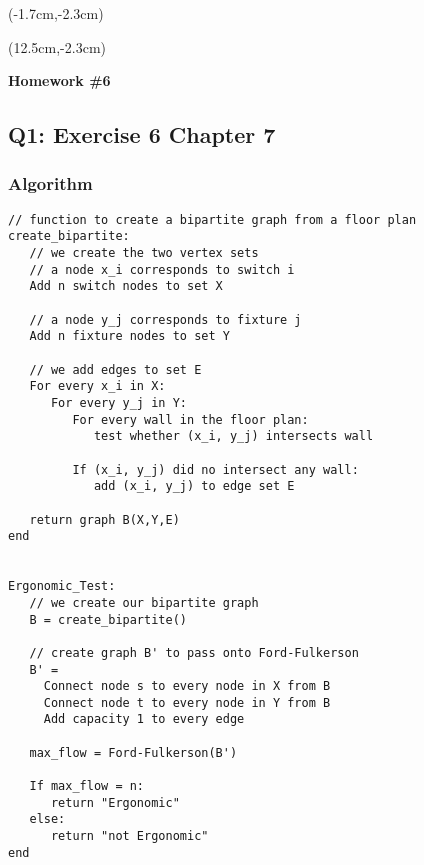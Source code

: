 \documentclass[12pt, oneside]{article}
\begin{document}
\begin{textblock*}{4cm}(-1.7cm,-2.3cm)
\end{textblock*}

\begin{textblock*}{8cm}(12.5cm,-2.3cm)
\end{textblock*}


\vspace{1cm}

\makeatletter
\setlength{\@fptop}{0pt}
\makeatother

\begin{center}
\textbf{\Large Homework \#6}
\end{center}


\subsection*{Q1: Exercise 6 Chapter 7}
\subsubsection*{Algorithm}
\begin{verbatim}
// function to create a bipartite graph from a floor plan
create_bipartite:
   // we create the two vertex sets
   // a node x_i corresponds to switch i
   Add n switch nodes to set X
   
   // a node y_j corresponds to fixture j
   Add n fixture nodes to set Y
   
   // we add edges to set E
   For every x_i in X:
      For every y_j in Y:
         For every wall in the floor plan:
            test whether (x_i, y_j) intersects wall
         
         If (x_i, y_j) did no intersect any wall:
            add (x_i, y_j) to edge set E
   
   return graph B(X,Y,E)
end


Ergonomic_Test:
   // we create our bipartite graph
   B = create_bipartite()
   
   // create graph B' to pass onto Ford-Fulkerson
   B' = 
     Connect node s to every node in X from B
     Connect node t to every node in Y from B
     Add capacity 1 to every edge
   
   max_flow = Ford-Fulkerson(B')
   
   If max_flow = n:
      return "Ergonomic"
   else:
      return "not Ergonomic" 
end
\end{verbatim}
\end{document}
